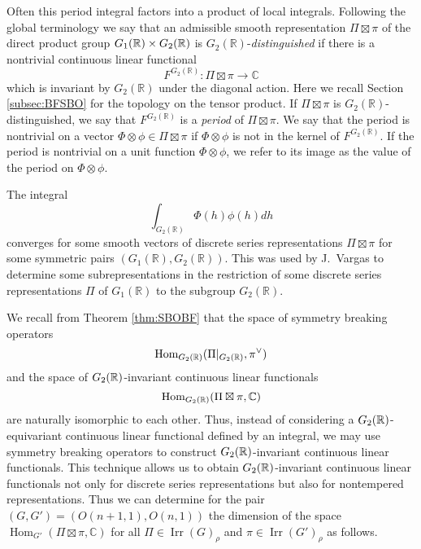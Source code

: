 Often this period integral  factors into a product of local integrals. Following the global terminology
 we say that an admissible smooth representation $\Pi \boxtimes \pi$
 of the direct product group $G_1({\mathbb R})\times G_2({\mathbb R})$ is $G_2({\mathbb R})$-{\it{distinguished}}
 if there is a nontrivial continuous linear functional 
\[F^{G_2({\mathbb R})}:\Pi \boxtimes \pi \rightarrow  {\mathbb C} \]
 which is invariant by $G_2({\mathbb{R}})$
 under the diagonal action.  
Here we recall Section \ref{subsec:BFSBO}
 for the topology on the tensor product.  
If $\Pi \boxtimes \pi$ is $G_2({\mathbb R})$-distinguished,
 we say that $F^{G_2({\mathbb R})}$ is a 
{\it{period}} of $\Pi \boxtimes \pi$.  
We say that the period is nontrivial
 on a vector
 $\Phi \otimes \phi \in \Pi \boxtimes \pi$
 if $\Phi \otimes \phi$ is not in the kernel of $F^{G_2({\mathbb R})}$. 
If the period is nontrivial on a unit function $\Phi \otimes \phi$,
 we refer to its image as the value of the period on $\Phi \otimes \phi$. 



\begin{remark} 
The integral 
\[  \int_{G_2(\mathbb R )}
\Phi (h) \phi (h) dh
\]
converges for some  smooth vectors of 
discrete series representations
 $\Pi \boxtimes \pi$
 for some symmetric pairs $(G_1(\mathbb R),G_2(\mathbb R))$.  
This was used by J.~Vargas \cite{Vargas}
 to determine  some subrepresentations
 in the restriction of some discrete series representations $\Pi$ of $G_1(\mathbb R)$
 to the subgroup $G_2(\mathbb R)$.  
\end{remark}


\medskip
We recall from Theorem \ref{thm:SBOBF}
 that the space of symmetry breaking operators 
\[ 
     \mbox{Hom}_{G_2({\mathbb R})}(\Pi|_{G_2({\mathbb R})}, \pi^{\vee}) 
\]
 and the space of $G_2({\mathbb R})$-invariant continuous linear functionals
\[\mbox{Hom}_{G_2({\mathbb R})}(\Pi \boxtimes \pi,{\mathbb C})\]
 are naturally isomorphic to each other. 
Thus, 
 instead of considering a $G_2({\mathbb R})$-equivariant continuous linear functional
 defined by an integral, 
 we may use symmetry breaking operators
 to construct $G_2({\mathbb R})$-invariant continuous  linear functionals. 
This technique allows us to obtain
$G_2({\mathbb R})$-invariant continuous linear functionals
 not only for discrete series representations
 but also for nontempered representations.  
Thus we can determine 
 for the pair $(G,G')= (O(n+1,1), O(n,1))$
 the dimension of the space
 ${\operatorname{Hom}}_{G'}(\Pi \boxtimes \pi, {\mathbb{C}})$
for all $\Pi \in {\operatorname{Irr}}(G)_{\rho}$
 and $\pi \in {\operatorname{Irr}}(G')_{\rho}$
 as follows.  



